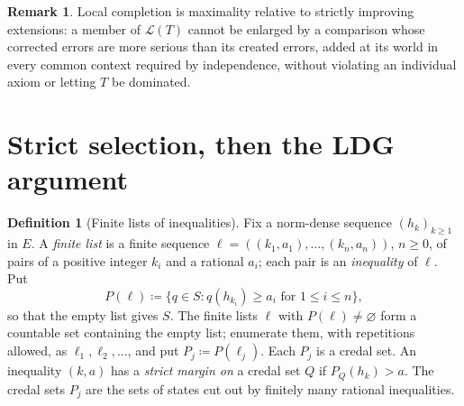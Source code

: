 \documentclass[11pt]{article}
\theoremstyle{definition}
\newtheorem{definition}[theorem]{Definition}
\newtheorem{remark}[theorem]{Remark}
\newcommand{\Lc}{\mathcal L}
\begin{document}
\begin{remark}\label{rem:maximal}
Local completion is maximality relative to strictly improving extensions: a member of $\Lc(T)$ cannot be enlarged by a comparison whose corrected errors are more serious than its created errors, added at its world in every common context required by independence, without violating an individual axiom or letting $T$ be dominated.
\end{remark}
\endgroup

\section{Strict selection, then the LDG argument}\label{sec:selection}

\begin{definition}[Finite lists of inequalities]\label{def:lists}
Fix a norm-dense sequence $(h_k)_{k\ge1}$ in $E$. A \emph{finite list} is a finite sequence $\ell=((k_1,a_1),\dots,(k_n,a_n))$, $n\ge0$, of pairs of a positive integer $k_i$ and a rational $a_i$; each pair is an \emph{inequality} of $\ell$. Put
\[
P(\ell)\coloneqq\{q\in S:q(h_{k_i})\ge a_i\text{ for }1\le i\le n\},
\]
so that the empty list gives $S$. The finite lists $\ell$ with $P(\ell)\ne\varnothing$ form a countable set containing the empty list; enumerate them, with repetitions allowed, as $\ell_1,\ell_2,\dots$, and put $P_j\coloneqq P(\ell_j)$. Each $P_j$ is a credal set. An inequality $(k,a)$ has a \emph{strict margin on} a credal set $Q$ if $P_Q(h_k)>a$. {\color{red}The credal sets $P_j$ are the sets of states cut out by finitely many rational inequalities.}
\end{definition}
\end{document}
